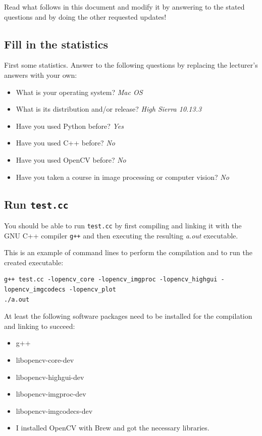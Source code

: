 \documentclass{article}
\begin{document}
Read what follows in this document and modify it by answering to the
stated questions and by doing the other requested updates!


\subsection{Fill in the statistics}

First some statistics.  Answer to the following questions by replacing
the lecturer's answers with your own:

\begin{itemize}
\item What is your operating system? \emph{Mac OS}
\item What is its distribution and/or release? \emph{High Sierra 10.13.3}
\item Have you used Python before? \emph{Yes}
\item Have you used C++ before? \emph{No}
\item Have you used OpenCV before? \emph{No}
\item Have you taken a course in image processing or computer vision? \emph{No}
\end{itemize}


\subsection{Run \texttt{test.cc}}

You should be able to run \texttt{test.cc} by first compiling and
linking it with the GNU C++ compiler \texttt{g++} and then executing
the resulting \emph{a.out} executable.

This is an example of command lines to perform the compilation and to
run the created executable:

{\small
\begin{verbatim}
g++ test.cc -lopencv_core -lopencv_imgproc -lopencv_highgui -lopencv_imgcodecs -lopencv_plot
./a.out
\end{verbatim}
}

At least the following software packages need to be installed for the
compilation and linking to succeed:

\begin{itemize}
\item g++
\item libopencv-core-dev
\item libopencv-highgui-dev
\item libopencv-imgproc-dev
\item libopencv-imgcodecs-dev
\item I installed OpenCV with Brew and got the necessary libraries.
\end{itemize}
\end{document}
